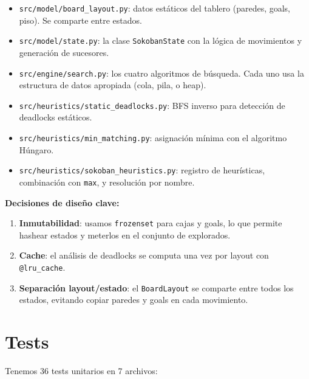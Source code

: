 \documentclass[12pt, a4paper]{article}
\begin{document}
\begin{itemize}
  \item \texttt{src/model/board\_layout.py}: datos estáticos del tablero (paredes, goals, piso). Se comparte entre estados.
  \item \texttt{src/model/state.py}: la clase \texttt{SokobanState} con la lógica de movimientos y generación de sucesores.
  \item \texttt{src/engine/search.py}: los cuatro algoritmos de búsqueda. Cada uno usa la estructura de datos apropiada (cola, pila, o heap).
  \item \texttt{src/heuristics/static\_deadlocks.py}: BFS inverso para detección de deadlocks estáticos.
  \item \texttt{src/heuristics/min\_matching.py}: asignación mínima con el algoritmo Húngaro.
  \item \texttt{src/heuristics/sokoban\_heuristics.py}: registro de heurísticas, combinación con \texttt{max}, y resolución por nombre.
\end{itemize}

\textbf{Decisiones de diseño clave:}

\begin{enumerate}
  \item \textbf{Inmutabilidad}: usamos \texttt{frozenset} para cajas y goals, lo que permite hashear estados y meterlos en el conjunto de explorados.
  \item \textbf{Cache}: el análisis de deadlocks se computa una vez por layout con \texttt{@lru\_cache}.
  \item \textbf{Separación layout/estado}: el \texttt{BoardLayout} se comparte entre todos los estados, evitando copiar paredes y goals en cada movimiento.
\end{enumerate}

\section{Tests}

Tenemos 36 tests unitarios en 7 archivos:
\end{document}
